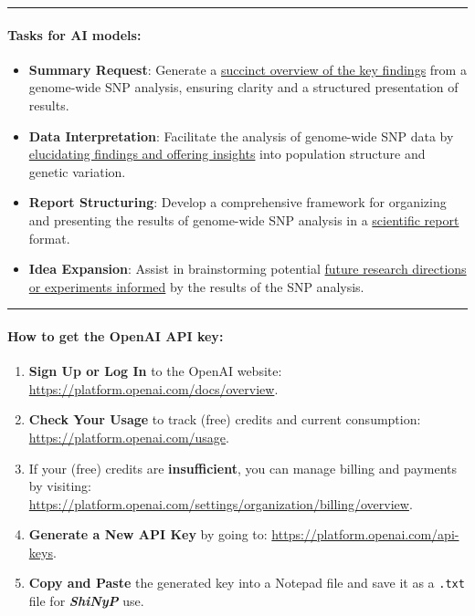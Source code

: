 \documentclass[
]{book}
\begin{document}
\begin{center}\rule{0.5\linewidth}{0.5pt}\end{center}

\paragraph*{Tasks for AI models:}\label{tasks-for-ai-models}

\begin{itemize}
\item
  \textbf{Summary Request}: Generate a \ul{succinct overview of the key findings} from a genome-wide SNP analysis, ensuring clarity and a structured presentation of results.
\item
  \textbf{Data Interpretation}: Facilitate the analysis of genome-wide SNP data by \ul{elucidating findings and offering insights} into population structure and genetic variation.
\item
  \textbf{Report Structuring}: Develop a comprehensive framework for organizing and presenting the results of genome-wide SNP analysis in a \ul{scientific report} format.
\item
  \textbf{Idea Expansion}: Assist in brainstorming potential \ul{future research directions or experiments informed} by the results of the SNP analysis.
\end{itemize}

\begin{center}\rule{0.5\linewidth}{0.5pt}\end{center}

\paragraph*{\texorpdfstring{\textbf{How to get the OpenAI API key}:}{How to get the OpenAI API key:}}\label{how-to-get-the-openai-api-key}

\begin{enumerate}
\def\labelenumi{\arabic{enumi}.}
\item
  \textbf{Sign Up or Log In} to the OpenAI website: \url{https://platform.openai.com/docs/overview}.
\item
  \textbf{Check Your Usage} to track (free) credits and current consumption: \url{https://platform.openai.com/usage}.
\item
  If your (free) credits are \textbf{insufficient}, you can manage billing and payments by visiting: \url{https://platform.openai.com/settings/organization/billing/overview}.
\item
  \textbf{Generate a New API Key} by going to: \url{https://platform.openai.com/api-keys}.
\item
  \textbf{Copy and Paste} the generated key into a Notepad file and save it as a \texttt{.txt} file for {\textbf{\emph{ShiNyP}}} use.
\end{enumerate}
\end{document}
